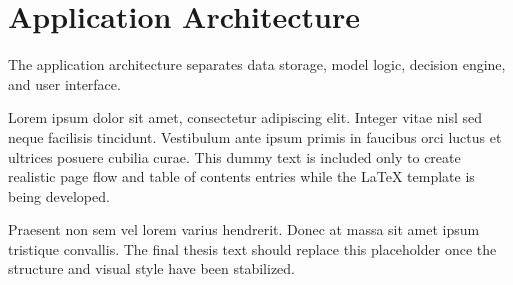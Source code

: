 \section{Application Architecture}

The application architecture separates data storage, model logic, decision engine, and user interface.

Lorem ipsum dolor sit amet, consectetur adipiscing elit. Integer vitae nisl sed neque facilisis tincidunt. Vestibulum ante ipsum primis in faucibus orci luctus et ultrices posuere cubilia curae. This dummy text is included only to create realistic page flow and table of contents entries while the LaTeX template is being developed.

Praesent non sem vel lorem varius hendrerit. Donec at massa sit amet ipsum tristique convallis. The final thesis text should replace this placeholder once the structure and visual style have been stabilized.

